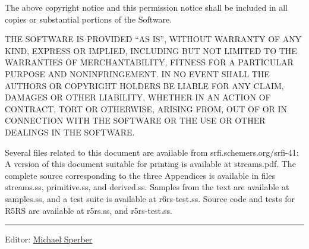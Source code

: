The above copyright notice and this permission notice shall be included
in all copies or substantial portions of the Software.

THE SOFTWARE IS PROVIDED ``AS IS'', WITHOUT WARRANTY OF ANY KIND,
EXPRESS OR IMPLIED, INCLUDING BUT NOT LIMITED TO THE WARRANTIES OF
MERCHANTABILITY, FITNESS FOR A PARTICULAR PURPOSE AND NONINFRINGEMENT.
IN NO EVENT SHALL THE AUTHORS OR COPYRIGHT HOLDERS BE LIABLE FOR ANY
CLAIM, DAMAGES OR OTHER LIABILITY, WHETHER IN AN ACTION OF CONTRACT,
TORT OR OTHERWISE, ARISING FROM, OUT OF OR IN CONNECTION WITH THE
SOFTWARE OR THE USE OR OTHER DEALINGS IN THE SOFTWARE.

Several files related to this document are available from
srfi.schemers.org/srfi-41: A version of this document suitable for
printing is available at streams.pdf. The complete source corresponding
to the three Appendices is available in files streams.ss, primitive.ss,
and derived.ss. Samples from the text are available at samples.ss, and a
test suite is available at r6rs-test.ss. Source code and tests for R5RS
are available at r5rs.ss, and r5rs-test.ss.

\begin{center}\rule{0.5\linewidth}{\linethickness}\end{center}

Editor:
\href{mailto:srfi-editors\%20at\%20srfi\%20dot\%20schemers\%20dot\%20org}{Michael
Sperber}

